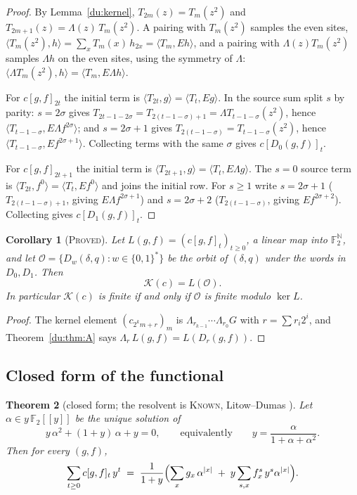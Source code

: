 \documentclass[11pt]{article}
\newtheorem{theorem}{Theorem}[section]
\newtheorem{corollary}[theorem]{Corollary}
\theoremstyle{definition}
\theoremstyle{remark}
\newcommand{\PROVED}{\textsc{Proved}}
\newcommand{\KNOWN}{\textsc{Known}}
\begin{document}
\begin{proof}
By Lemma~\ref{du:kernel}, $T_{2m}(z)=T_m(z^2)$ and $T_{2m+1}(z)=\Lambda(z)\,T_m(z^2)$.
A pairing with $T_m(z^2)$ samples the even sites,
$\langle T_m(z^2), h\rangle = \sum_x T_m(x)\,h_{2x} = \langle T_m, Eh\rangle$,
and a pairing with $\Lambda(z)T_m(z^2)$ samples $\Lambda h$ on the even sites,
using the symmetry of $\Lambda$: $\langle \Lambda T_m(z^2), h\rangle = \langle T_m, E\Lambda h\rangle$.

For $c[g,f]_{2t}$ the initial term is $\langle T_{2t}, g\rangle = \langle T_t, Eg\rangle$.
In the source sum split $s$ by parity: $s=2\sigma$ gives $T_{2t-1-2\sigma}=T_{2(t-1-\sigma)+1}=\Lambda T_{t-1-\sigma}(z^2)$,
hence $\langle T_{t-1-\sigma}, E\Lambda f^{2\sigma}\rangle$; and $s=2\sigma+1$ gives
$T_{2(t-1-\sigma)}=T_{t-1-\sigma}(z^2)$, hence $\langle T_{t-1-\sigma}, E f^{2\sigma+1}\rangle$.
Collecting terms with the same $\sigma$ gives $c[D_0(g,f)]_t$.

For $c[g,f]_{2t+1}$ the initial term is $\langle T_{2t+1}, g\rangle = \langle T_t, E\Lambda g\rangle$.
The $s=0$ source term is $\langle T_{2t}, f^0\rangle = \langle T_t, E f^0\rangle$ and joins the
initial row. For $s\ge 1$ write $s=2\sigma+1$ ($T_{2(t-1-\sigma)+1}$, giving $E\Lambda f^{2\sigma+1}$)
and $s=2\sigma+2$ ($T_{2(t-1-\sigma)}$, giving $E f^{2\sigma+2}$). Collecting gives $c[D_1(g,f)]_t$.
\end{proof}

\begin{corollary}[\PROVED]\label{du:cor:orbit}
Let $L(g,f) = (c[g,f]_t)_{t\ge 0}$, a linear map into $\mathbb F_2^{\mathbb N}$, and let
$\mathcal O = \{ D_{w}(\delta,q) : w \in \{0,1\}^* \}$ be the orbit of $(\delta,q)$ under
the words in $D_0, D_1$. Then
\[
  \mathcal K(c) = L(\mathcal O).
\]
In particular $\mathcal K(c)$ is finite if and only if $\mathcal O$ is finite modulo $\ker L$.
\end{corollary}

\begin{proof}
The kernel element $(c_{2^k m + r})_m$ is $\Lambda_{r_{k-1}}\cdots\Lambda_{r_0}G$ with
$r=\sum r_i 2^i$, and Theorem~\ref{du:thm:A} says $\Lambda_{r}\,L(g,f) = L(D_{r}(g,f))$.
\end{proof}

\subsection{Closed form of the functional}

\begin{theorem}[closed form; the resolvent is \KNOWN, Litow--Dumas \cite{LD}]\label{du:thm:B}
Let $\alpha\in y\,\mathbb F_2[[y]]$ be the unique solution of
\[
  y\,\alpha^2 + (1+y)\,\alpha + y = 0, \qquad\text{equivalently}\qquad
  y = \frac{\alpha}{1+\alpha+\alpha^2}.
\]
Then for every $(g,f)$,
\[
  \sum_{t\ge 0} c[g,f]_t\, y^t \;=\; \frac{1}{1+y}\Bigl(\sum_{x} g_x\,\alpha^{|x|}
  \;+\; y\sum_{s,x} f^s_x\, y^{s}\alpha^{|x|}\Bigr).
\]
\end{theorem}
\end{document}
